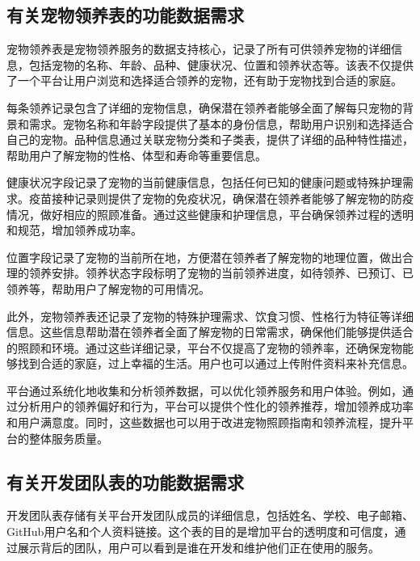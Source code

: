 \subsection{有关宠物领养表的功能数据需求}

宠物领养表是宠物领养服务的数据支持核心，记录了所有可供领养宠物的详细信息，包括宠物的名称、年龄、品种、健康状况、位置和领养状态等。该表不仅提供了一个平台让用户浏览和选择适合领养的宠物，还有助于宠物找到合适的家庭。

每条领养记录包含了详细的宠物信息，确保潜在领养者能够全面了解每只宠物的背景和需求。宠物名称和年龄字段提供了基本的身份信息，帮助用户识别和选择适合自己的宠物。品种信息通过关联宠物分类和子类表，提供了详细的品种特性描述，帮助用户了解宠物的性格、体型和寿命等重要信息。

健康状况字段记录了宠物的当前健康信息，包括任何已知的健康问题或特殊护理需求。疫苗接种记录则提供了宠物的免疫状况，确保潜在领养者能够了解宠物的防疫情况，做好相应的照顾准备。通过这些健康和护理信息，平台确保领养过程的透明和规范，增加领养成功率。

位置字段记录了宠物的当前所在地，方便潜在领养者了解宠物的地理位置，做出合理的领养安排。领养状态字段标明了宠物的当前领养进度，如待领养、已预订、已领养等，帮助用户了解宠物的可用情况。

此外，宠物领养表还记录了宠物的特殊护理需求、饮食习惯、性格行为特征等详细信息。这些信息帮助潜在领养者全面了解宠物的日常需求，确保他们能够提供适合的照顾和环境。通过这些详细记录，平台不仅提高了宠物的领养率，还确保宠物能够找到合适的家庭，过上幸福的生活。用户也可以通过上传附件资料来补充信息。

平台通过系统化地收集和分析领养数据，可以优化领养服务和用户体验。例如，通过分析用户的领养偏好和行为，平台可以提供个性化的领养推荐，增加领养成功率和用户满意度。同时，这些数据也可以用于改进宠物照顾指南和领养流程，提升平台的整体服务质量。

\subsection{有关开发团队表的功能数据需求}

开发团队表存储有关平台开发团队成员的详细信息，包括姓名、学校、电子邮箱、GitHub用户名和个人资料链接。这个表的目的是增加平台的透明度和可信度，通过展示背后的团队，用户可以看到是谁在开发和维护他们正在使用的服务。